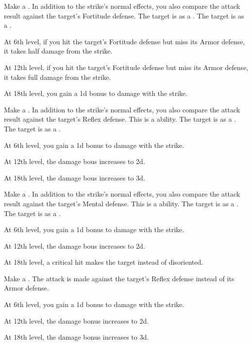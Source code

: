 {             Make a .
            In addition to the strike's normal effects, you also compare the attack result against the target's Fortitude defense.
             The target is \sickened as a .
             The target is \nauseated as a .
            \par At 6th level, if you hit the target's Fortitude defense but miss its Armor defense, it takes half damage from the strike.
            \par At 12th level, if you hit the target's Fortitude defense but miss its Armor defense, it takes full damage from the strike.
            \par At 18th level, you gain a \plus1d bonus to damage with the strike.

             Make a .
            In addition to the strike's normal effects, you also compare the attack result against the target's Reflex defense.
            This is a  ability.
             The target is \slowed as a .
             The target is \immobilized as a .
            \par At 6th level, you gain a \plus1d bonus to damage with the strike.
            \par At 12th level, the damage bous increases to \plus2d.
            \par At 18th level, the damage bous increases to \plus3d.

             Make a .
            In addition to the strike's normal effects, you also compare the attack result against the target's Mental defense.
            This is a  ability.
             The target is \bewildered as a .
             The target is \disoriented as a .
            \par At 6th level, you gain a \plus1d bonus to damage with the strike.
            \par At 12th level, the damage bous increases to \plus2d.
            \par At 18th level, a critical hit makes the target \stunned instead of disoriented.

             Make a .
            The attack is made against the target's Reflex defense instead of its Armor defense.
            \par At 6th level, you gain a \plus1d bonus to damage with the strike.
            \par At 12th level, the damage bonus increases to \plus2d.
            \par At 18th level, the damage bonus increases to \plus3d.

}
